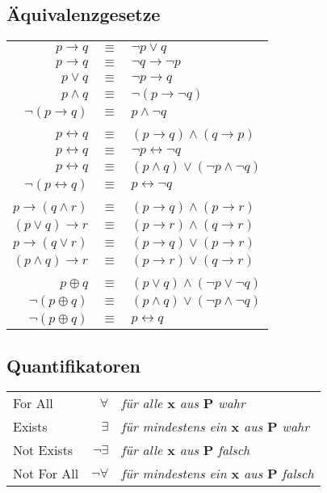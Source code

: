 \subsection{Äquivalenzgesetze}
\begin{tabular}{rcl}
	$p \rightarrow q$ & $\equiv$ & $\neg p \vee q$ \\
	$p \rightarrow q$ & $\equiv$ & $\neg q \rightarrow \neg p$ \\
	$p \vee q$ & $\equiv$ & $\neg p \rightarrow q$ \\
	$p \wedge q$ & $\equiv$ & $\neg (p \rightarrow \neg q)$ \\
	$\neg (p \rightarrow q)$ & $\equiv$ & $p \wedge \neg q$ \\
	\\
	$p \leftrightarrow q$ & $\equiv$ & $(p \rightarrow q) \wedge (q \rightarrow p)$ \\
	$p \leftrightarrow q$ & $\equiv$ & $\neg p \leftrightarrow \neg q$ \\
	$p \leftrightarrow q$ & $\equiv$ & $(p \wedge q) \vee (\neg p \wedge \neg q)$ \\
	$\neg (p \leftrightarrow q)$ & $\equiv$ & $p \leftrightarrow \neg q$ \\
	\\
	$p \rightarrow (q \wedge r)$ & $\equiv$ & $(p \rightarrow q) \wedge (p \rightarrow r)$ \\
	$(p \vee q) \rightarrow r$ & $\equiv$ & $(p \rightarrow r) \wedge (q \rightarrow r)$ \\
	$p \rightarrow (q \vee r)$ & $\equiv$ & $(p \rightarrow q) \vee (p \rightarrow r)$ \\
	$(p \wedge q) \rightarrow r$ & $\equiv$ & $(p \rightarrow r) \vee (q \rightarrow r)$ \\
	\\
	$p \oplus q$ & $\equiv$ & $(p \vee q) \wedge (\neg p \vee \neg q)$ \\
	$\neg (p \oplus q)$ & $\equiv$ & $(p \wedge q) \vee (\neg p \wedge \neg q)$ \\
	$\neg (p \oplus q)$ & $\equiv$ & $p \leftrightarrow q$ \\
\end{tabular}

\subsection{Quantifikatoren}
\begin{tabular}{lrl}
	For All & $\forall$ & \textit{für alle $\textbf{x}$ aus $\textbf{P}$ wahr} \\ 
	Exists & $\exists$ & \textit{für mindestens ein $\textbf{x}$ aus $\textbf{P}$ wahr} \\ 
	Not Exists & $\neg \exists$ & \textit{für alle $\textbf{x}$ aus $\textbf{P}$ falsch} \\ 
	Not For All & $\neg \forall$ & \textit{für mindestens ein $\textbf{x}$ aus $\textbf{P}$ falsch} \\ 
\end{tabular} 

